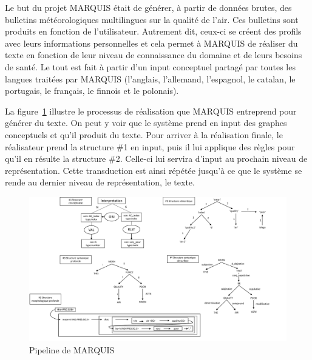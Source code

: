Le but du projet MARQUIS était de générer, à partir de données brutes, des bulletins météorologiques multilingues sur la qualité de l'air. Ces bulletins sont produits en fonction de l'utilisateur. Autrement dit, ceux-ci se créent des profils avec leurs informations personnelles et cela permet à MARQUIS de réaliser du texte en fonction de leur niveau de connaissance du domaine et de leurs besoins de santé. Le tout est fait à partir d'un input conceptuel partagé par toutes les langues traitées par MARQUIS (l'anglais, l'allemand, l'espagnol, le catalan, le portugais, le français, le finnois et le polonais). 

La figure~\ref{fig:marquis} illustre le processus de réalisation que MARQUIS entreprend pour générer du texte. On peut y voir que le système prend en input des graphes conceptuels et qu'il produit du texte. Pour arriver à la réalisation finale, le réalisateur prend la structure \#1 en input, puis il lui applique des règles pour qu'il en résulte la structure \#2. Celle-ci lui servira d'input au prochain niveau de représentation. Cette transduction est ainsi répétée jusqu'à ce que le système se rende au dernier niveau de représentation, le texte.

\begin{figure}[htb]
	\centering
	\includegraphics[width=1\textwidth, trim = {0cm 0cm 0cm 0cm},clip]{ch2/figs/marquis.pdf}
	\caption{Pipeline de MARQUIS \citep{WannerMARQUISGENERATIONUSERTAILORED2010}}
	\label{fig:marquis}
\end{figure}

